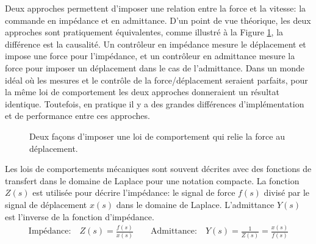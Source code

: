 Deux approches permettent d'imposer une relation entre la force et la vitesse: la commande en impédance et en admittance. D'un point de vue théorique, les deux approches sont pratiquement équivalentes, comme illustré à la Figure \ref{fig:impedanceadmitancecontrolbloc}, la différence est la causalité. Un contrôleur en impédance mesure le déplacement et impose une force pour l'impédance, et un contrôleur en admittance mesure la force pour imposer un déplacement dans le cas de l'admittance. Dans un monde idéal où les mesures et le contrôle de la force/déplacement seraient parfaits, pour la même loi de comportement les deux approches donneraient un résultat identique. Toutefois, en pratique il y a des grandes différences d'implémentation et de performance entre ces approches.
\begin{figure}[H]
	\centering
	\hspace{30pt}
	\caption{Deux façons d'imposer une loi de comportement qui relie la force au déplacement.}
	\label{fig:impedanceadmitancecontrolbloc}
\end{figure}

Les lois de comportements mécaniques sont souvent décrites avec des fonctions de transfert dans le domaine de Laplace pour une notation compacte. La fonction $Z(s)$ est utilisée pour décrire l'impédance: le signal de force $f(s)$ divisé par le signal de déplacement $x(s)$ dans le domaine de Laplace. L'admittance $Y(s)$ est l'inverse de la fonction d'impédance.
\begin{align}
	\text{Impédance:} \quad Z(s) = \frac{f(s)}{x(s)} \quad\quad \text{Admittance:} \quad Y(s) =  \frac{1}{Z(s)} = \frac{x(s)}{f(s)}
\end{align}


